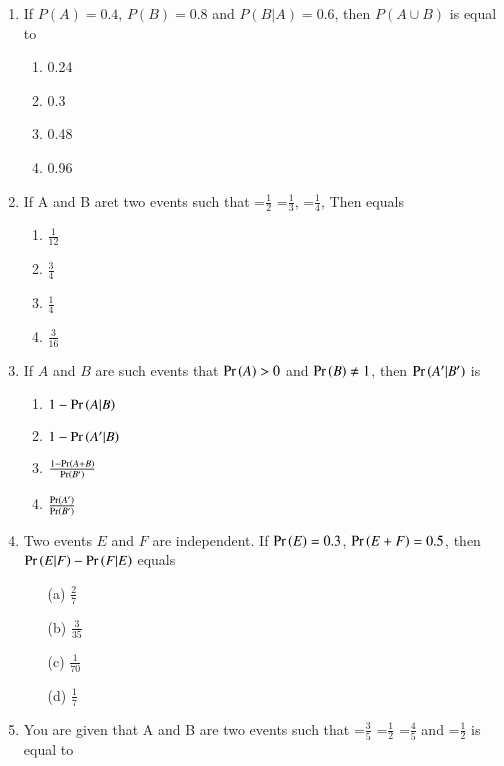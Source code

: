 \begin{enumerate}[resume*]
\solution

\item If $P(A)=0.4$, $P(B)=0.8$ and $P(B|A)=0.6$, then $P(A \cup B)$ is equal to
\begin{enumerate}
\item 0.24
\item 0.3
\item 0.48
\item 0.96
\end{enumerate}
\solution

\item If A and B aret two events such that  =$\frac{1}{2}$  =$\frac{1}{3}$, =$\frac{1}{4}$, Then  equals
\begin{enumerate}
	\item $\frac{1}{12}$
	\item $\frac{3}{4}$
	\item $\frac{1}{4}$
	\item $\frac{3}{16}$	
\end{enumerate}
\solution

\item If $A$ and $B$ are such events that $\Pr\left(A\right) > 0$ and $\Pr\left(B\right)\neq 1$, then $\Pr\left(A^\prime|B^\prime\right)$ is
\begin{enumerate}
\item $1-\Pr\left(A|B\right)$
\item $1-\Pr\left(A^\prime|B\right)$
\item $\frac{1-\Pr\left(A+B\right)}{\Pr\left(B^\prime\right)}$
\item $\frac{\Pr\left(A^\prime\right)}{\Pr\left(B^\prime\right)}$
\end{enumerate}

\item  Two events $E$ and $F$ are independent. If $\Pr\left(E\right) = 0.3$, $\Pr\left(E+F\right) = 0.5$, then $\Pr\left(E|F\right)-\Pr\left(F|E\right)$ equals
\begin{enumerate}
    \item[(a)] $\frac{2}{7}$
    \item[(b)] $\frac{3}{35}$
    \item[(c)] $\frac{1}{70}$
    \item[(d)] $\frac{1}{7}$
\end{enumerate}
\solution

\item You are given that A and B are two events such that =$\frac{3}{5}$ =$\frac{1}{2}$ =$\frac{4}{5}$ and =$\frac{1}{2}$   is equal to\\


\end{enumerate}
